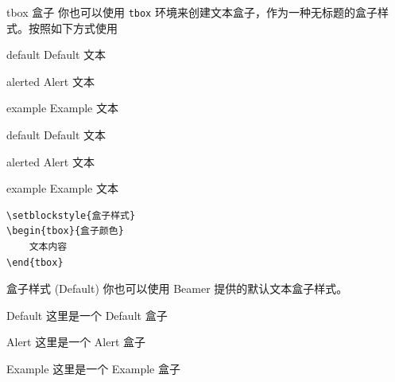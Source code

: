\documentclass[10pt,aspectratio=169,fontset=none]{ctexbeamer}
\begin{document}
    \begin{frame}[fragile]{tbox 盒子}
        你也可以使用 \texttt{tbox} 环境来创建文本盒子，作为一种无标题的盒子样式。按照如下方式使用
        
        \begin{minipage}[b]{0.23\textwidth}
        \begin{tbox}{default}
            Default 文本
        \end{tbox}
        \begin{tbox}{alerted}
            Alert 文本
        \end{tbox}
        \begin{tbox}{example}
            Example 文本
        \end{tbox}      
        \end{minipage}
        \hspace{1cm}
        \begin{minipage}[b]{0.23\textwidth}
        \begin{tbox}{default}
            Default 文本
        \end{tbox}
        \begin{tbox}{alerted}
            Alert 文本
        \end{tbox}
        \begin{tbox}{example}
            Example 文本
        \end{tbox}      
        \end{minipage}
        \hspace{0.7cm}
        \begin{minipage}[b]{0.35\textwidth}
            \begin{verbatim}
\setblockstyle{盒子样式}
\begin{tbox}{盒子颜色}
    文本内容
\end{tbox}
            \end{verbatim}
        \end{minipage}
    \end{frame}

    \begin{frame}{盒子样式 (Default)}
        你也可以使用 Beamer 提供的默认文本盒子样式。
        \begin{center}
            \begin{minipage}[b]{0.5\textwidth}
                \begin{block}{ Default }
                    这里是一个 Default 盒子
                \end{block}
                \begin{alertblock}{Alert}
                    这里是一个 Alert 盒子
                \end{alertblock}
                \begin{exampleblock}{Example}
                    这里是一个 Example 盒子
                \end{exampleblock}
            \end{minipage}
        \end{center}
    \end{frame}
\end{document}
